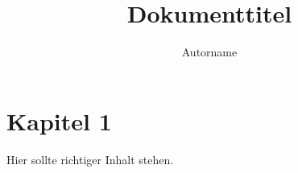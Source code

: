 \documentclass[ngerman]{scrartcl}
\title{Dokumenttitel}
\author{Autorname}
\begin{document}
 \maketitle

 \tableofcontents
 \cleardoublepage

 \section{Kapitel 1}
 \label{sec:kap1}

 Hier sollte richtiger Inhalt stehen.
\end{document}
